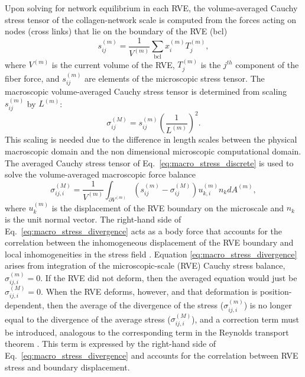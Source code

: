 \documentclass[]{interact}
\begin{document}
Upon solving for network equilibrium in each RVE, the volume-averaged Cauchy stress tensor of the collagen-network scale is computed from the forces acting on nodes (cross links) that lie on the boundary of the RVE (bcl) \citep{Chandran:2007hy,Stylianopoulos:2007dp}
%
\begin{equation}
s_{ij}^{(m)} = \frac{1}{V^{(m)}} \sum_{\text{bcl}} x_i^{(m)} T_j^{(m)} ,
\label{eq:micro_stress_discrete}
\end{equation}
%
where $V^{(m)}$ is the current volume of the RVE, $T_j^{(m)}$ is the $j^{th}$ component of the fiber force, and $s_{ij}^{(m)}$ are elements of the microscopic stress tensor. The macroscopic volume-averaged Cauchy stress tensor is determined from scaling $s_{ij}^{(m)}$ by  $L^{(m)}$:
%
\begin{equation}
\sigma_{ij}^{(M)} = s_{ij}^{(m)}\left(\frac{1}{L^{(m)}}\right)^2.
\label{eq:macro_stress_discrete}
\end{equation}
%
This scaling is needed due to the difference in length scales between the physical macroscopic domain and the non dimensional microscopic computational domain. The averaged Cauchy stress tensor of Eq.\ \eqref{eq:macro_stress_discrete} is used to solve the volume-averaged macroscopic force balance \citep{Chandran:2007hy,Stylianopoulos:2007dp}
%
\begin{equation}
\sigma_{ij,i}^{(M)} = \frac{1}{V^{(m)}} \int_{\partial V^{(m)}} \left( s_{ij}^{(m)} - \sigma_{ij}^{(M)} \right)u_{k,i}^{(m)} n_k dA^{(m)},
\label{eq:macro_stress_divergence}
\end{equation}
%
where $u_k^{(m)}$ is the displacement of the RVE boundary on the microscale and $n_k$ is the unit normal vector. The right-hand side of Eq.\ \eqref{eq:macro_stress_divergence} acts as a body force that accounts for the correlation between the inhomogeneous displacement of the RVE boundary and local inhomogeneities in the stress field \citep{Chandran:2007hy,Stylianopoulos:2007dp}. Equation \eqref{eq:macro_stress_divergence} arises from integration of the microscopic-scale (RVE) Cauchy stress balance, $\sigma_{ij,i}^{(m)} = 0$. If the RVE did not deform, then the averaged equation would just be $\sigma^{(M)}_{ij,i}=0$. When the RVE deforms, however, and that deformation is position-dependent, then the average of the divergence of the stress ($\sigma_{ij,i}^{(m)}$) is no longer equal to the divergence of the average stress ($\sigma_{ij,i}^{(M)}$), and a correction term must be introduced, analogous to the corresponding term in the Reynolds transport theorem \citep{Whitaker-1999}. This term is expressed by the right-hand side of Eq.\ \eqref{eq:macro_stress_divergence} and accounts for the correlation between RVE stress and boundary displacement.
\end{document}
